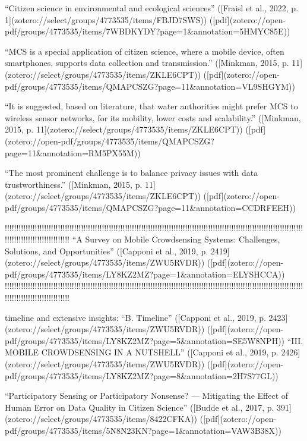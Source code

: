 {“Citizen science in environmental and ecological sciences” ([Fraisl et al., 2022, p. 1](zotero://select/groups/4773535/items/FBJD7SWS)) ([pdf](zotero://open-pdf/groups/4773535/items/7WBDKYDY?page=1&annotation=5HMYC85E))

“MCS is a special application of citizen science, where a mobile device, often smartphones, supports data collection and transmission.” ([Minkman, 2015, p. 11](zotero://select/groups/4773535/items/ZKLE6CPT)) ([pdf](zotero://open-pdf/groups/4773535/items/QMAPCSZG?page=11&annotation=VL9SHGYM))

“It is suggested, based on literature, that water authorities might prefer MCS to wireless sensor networks, for its mobility, lower costs and scalability.” ([Minkman, 2015, p. 11](zotero://select/groups/4773535/items/ZKLE6CPT)) ([pdf](zotero://open-pdf/groups/4773535/items/QMAPCSZG?page=11&annotation=RM5PX55M))

“The most prominent challenge is to balance privacy issues with data trustworthiness.” ([Minkman, 2015, p. 11](zotero://select/groups/4773535/items/ZKLE6CPT)) ([pdf](zotero://open-pdf/groups/4773535/items/QMAPCSZG?page=11&annotation=CCDRFEEH))

!!!!!!!!!!!!!!!!!!!!!!!!!!!!!!!!!!!!!!!!!!!!!!!!!!!!!!!!!!!!!!!!!!!!!!!!!!!!!!!!!!!!!!!!!!!!!!!!!!!!!!!!!!!!!!!!!!!!!!!!!!!!!!!!!!!!!!!!!!!!!!!!!!!!!!!!!!!!!
“A Survey on Mobile Crowdsensing Systems: Challenges, Solutions, and Opportunities” ([Capponi et al., 2019, p. 2419](zotero://select/groups/4773535/items/ZWU5RVDR)) ([pdf](zotero://open-pdf/groups/4773535/items/LY8KZ2MZ?page=1&annotation=ELYSHCCA))
!!!!!!!!!!!!!!!!!!!!!!!!!!!!!!!!!!!!!!!!!!!!!!!!!!!!!!!!!!!!!!!!!!!!!!!!!!!!!!!!!!!!!!!!!!!!!!!!!!!!!!!!!!!!!!!!!!!!!!!!!!!!!!!!!!!!!!!!!!!!!!!!!!!!!!!!!!!!!

timeline and extensive insights:
“B. Timeline” ([Capponi et al., 2019, p. 2423](zotero://select/groups/4773535/items/ZWU5RVDR)) ([pdf](zotero://open-pdf/groups/4773535/items/LY8KZ2MZ?page=5&annotation=SE5W8NPH))
“III. MOBILE CROWDSENSING IN A NUTSHELL” ([Capponi et al., 2019, p. 2426](zotero://select/groups/4773535/items/ZWU5RVDR)) ([pdf](zotero://open-pdf/groups/4773535/items/LY8KZ2MZ?page=8&annotation=2H7S77GL))

“Participatory Sensing or Participatory Nonsense? — Mitigating the Effect of Human Error on Data Quality in Citizen Science” ([Budde et al., 2017, p. 391](zotero://select/groups/4773535/items/8422CFKA)) ([pdf](zotero://open-pdf/groups/4773535/items/5N8N23KN?page=1&annotation=VAW3B38X))

}
